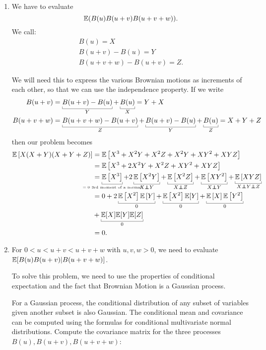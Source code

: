\documentclass[12pt]{article}
\begin{document}
	\begin{enumerate}
		\item We have to evaluate 
		\begin{equation*}
			\mathbb{E}(B(u)B(u+v)B(u+v+w)).
		\end{equation*}
		We call:
		\begin{equation*}
			\begin{array}{l}
				B(u)=X\\
				B(u+v)-B(u)=Y\\
				B(u+v+w)-B(u+v)=Z.
			\end{array}
		\end{equation*}
		
		
		We will need this to express the various Brownian motions as increments of each other, so that we can use the independence property. If we write
		\begin{align*}
			B(u+v)&=\ubracketthin{B(u+v)-B(u)}_{Y}+\ubracketthin{B(u)}_{X}=Y+X\\
			B(u+v+w)&=\ubracketthin{B(u+v+w)-B(u+v)}_{Z}+\ubracketthin{B(u+v)-B(u)}_{Y}+\ubracketthin{B(u)}_{Z}=X+Y+Z
		\end{align*}
		then our problem becomes
		\begin{align*}
			\ev\left[X(X+Y)(X+Y+Z)\right]&=\ev\left[X^{3}+X^{2}Y+X^{2}Z+X^{2}Y+XY^{2}+XYZ\right]\\
			&=\ev\left[X^{3}+2X^{2}Y+X^{2}Z+XY^{2}+XYZ\right]\\
			&=\ubracketthin{\ev\left[X^{3}\right]}_{\scriptscriptstyle\mathclap{\text{$=0$ 3rd moment of a normal}}}+2\ubracketthin{\ev\left[X^{2}Y\right]}_{X\independent Y}+\ubracketthin{\ev\left[X^{2}Z\right]}_{X\independent Z}+\ubracketthin{\ev\left[XY^{2}\right]}_{X\independent Y}+\ubracketthin{\ev\left[XYZ\right]}_{X\independent Y\independent Z}\\
			&=0+2\ubracketthin{\ev\left[X^{2}\right]\ev\left[Y\right]}_{0}+\ubracketthin{\ev\left[X^{2}\right]\ev[Y]}_{0}+\ubracketthin{\ev\left[X\right]\ev\left[Y^{2}\right]}_{0}\\&+\ubracketthin{\ev[X]\ev[Y]\ev[Z]}_{0}\\
			&=0.
		\end{align*}
		\item For $0 < u < u+v < u+v+w$ with $u,v,w > 0$, we need to evaluate $\mathbb{E}[B(u)B(u+v)|B(u+v+w)]$.
		
		To solve this problem, we need to use the properties of conditional expectation and the fact that Brownian Motion is a Gaussian process.
		
		For a Gaussian process, the conditional distribution of any subset of variables given another subset is also Gaussian. The conditional mean and covariance can be computed using the formulas for conditional multivariate normal distributions.
		Compute the covariance matrix for the three processes $B(u), B(u+v), B(u+v+w)$:
		

\end{enumerate}
\end{document}

